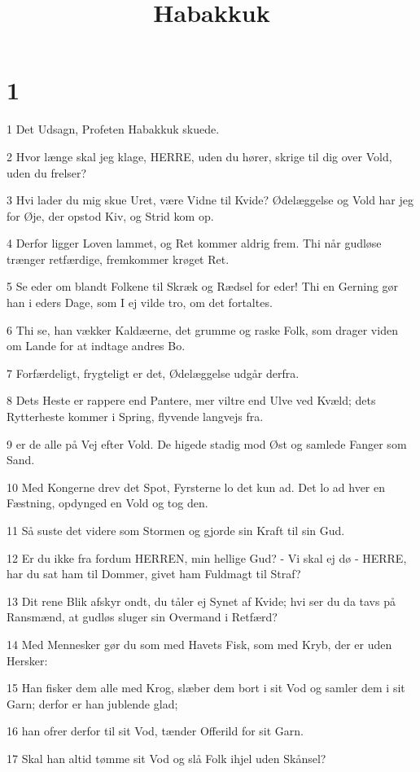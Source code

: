

\title{Habakkuk}


\chapter{1}

\par 1 Det Udsagn, Profeten Habakkuk skuede.
\par 2 Hvor længe skal jeg klage, HERRE, uden du hører, skrige til dig over Vold, uden du frelser?
\par 3 Hvi lader du mig skue Uret, være Vidne til Kvide? Ødelæggelse og Vold har jeg for Øje, der opstod Kiv, og Strid kom op.
\par 4 Derfor ligger Loven lammet, og Ret kommer aldrig frem. Thi når gudløse trænger retfærdige, fremkommer krøget Ret.
\par 5 Se eder om blandt Folkene til Skræk og Rædsel for eder! Thi en Gerning gør han i eders Dage, som I ej vilde tro, om det fortaltes.
\par 6 Thi se, han vækker Kaldæerne, det grumme og raske Folk, som drager viden om Lande for at indtage andres Bo.
\par 7 Forfærdeligt, frygteligt er det, Ødelæggelse udgår derfra.
\par 8 Dets Heste er rappere end Pantere, mer viltre end Ulve ved Kvæld; dets Rytterheste kommer i Spring, flyvende langvejs fra.
\par 9 er de alle på Vej efter Vold. De higede stadig mod Øst og samlede Fanger som Sand.
\par 10 Med Kongerne drev det Spot, Fyrsterne lo det kun ad. Det lo ad hver en Fæstning, opdynged en Vold og tog den.
\par 11 Så suste det videre som Stormen og gjorde sin Kraft til sin Gud.
\par 12 Er du ikke fra fordum HERREN, min hellige Gud? - Vi skal ej dø - HERRE, har du sat ham til Dommer, givet ham Fuldmagt til Straf?
\par 13 Dit rene Blik afskyr ondt, du tåler ej Synet af Kvide; hvi ser du da tavs på Ransmænd, at gudløs sluger sin Overmand i Retfærd?
\par 14 Med Mennesker gør du som med Havets Fisk, som med Kryb, der er uden Hersker:
\par 15 Han fisker dem alle med Krog, slæber dem bort i sit Vod og samler dem i sit Garn; derfor er han jublende glad;
\par 16 han ofrer derfor til sit Vod, tænder Offerild for sit Garn.
\par 17 Skal han altid tømme sit Vod og slå Folk ihjel uden Skånsel?

